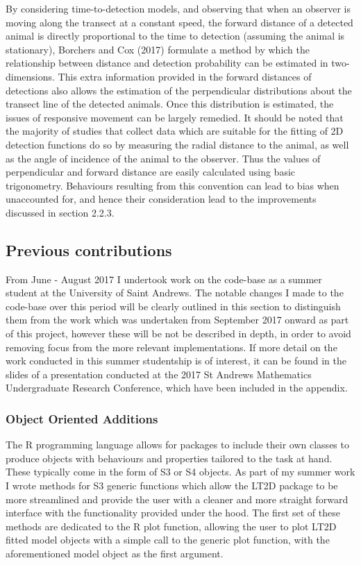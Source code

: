 \documentclass[11pt]{article}
\begin{document}
\begin{multicols}{2}
By considering time-to-detection models, and observing that when an observer is moving along the transect at a constant speed, the forward distance of a detected animal is directly proportional to the time to detection (assuming the animal is stationary), Borchers and Cox (2017) formulate a method by which the relationship between distance and detection probability can be estimated in two-dimensions. This extra information provided in the forward distances of detections also allows the estimation of the perpendicular distributions about the transect line of the detected animals. Once this distribution is estimated, the issues of responsive movement can be largely remedied. It should be noted that the majority of studies that collect data which are suitable for the fitting of 2D detection functions do so by measuring the radial distance to the animal, as well as the angle of incidence of the animal to the observer. Thus the values of perpendicular and forward distance are easily calculated using basic trigonometry. Behaviours resulting from this convention can lead to bias when unaccounted for, and hence their consideration lead to the improvements discussed in section 2.2.3. 

\subsection{Previous contributions}

From June - August 2017 I undertook work on the code-base as a summer student at the University of Saint Andrews. The notable changes I made to the code-base over this period will be clearly outlined in this section to distinguish them from the work which was undertaken from September 2017 onward as part of this project, however these will be not be described in depth, in order to avoid removing focus from the more relevant implementations. If more detail on the work conducted in this summer studentship is of interest, it can be found in the slides of a presentation conducted at the 2017 St Andrews Mathematics Undergraduate Research Conference, which have been included in the appendix. 

\subsubsection{Object Oriented Additions}
The R programming language allows for packages to include their own classes to produce objects with behaviours and properties tailored to the task at hand. These typically come in the form of S3 or S4 objects. As part of my summer work I wrote methods for S3 generic functions which allow the LT2D package to be more streamlined and provide the user with a cleaner and more straight forward interface with the functionality provided under the hood. The first set of these methods are dedicated to the R plot function, allowing the user to plot LT2D fitted model objects with a simple call to the generic plot function, with the aforementioned model object as the first argument. 


\end{multicols}
\end{document}
